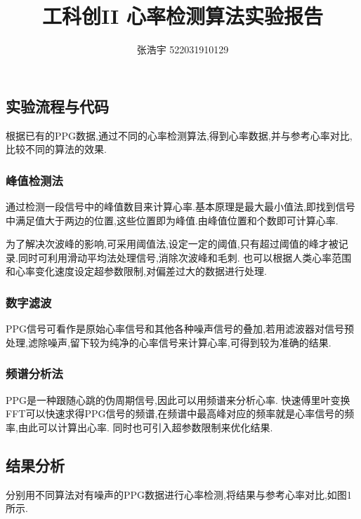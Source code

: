 \documentclass[12pt, a4paper, oneside]{ctexart}
\title{\textbf{工科创II 心率检测算法实验报告}}
\author{张浩宇 522031910129}
\date{}
\begin{document}
    \maketitle
    \subsection{实验流程与代码}
    根据已有的PPG数据,通过不同的心率检测算法,得到心率数据,并与参考心率对比,比较不同的算法的效果.
    \subsubsection{峰值检测法}
    通过检测一段信号中的峰值数目来计算心率.基本原理是最大最小值法,即找到信号中满足值大于两边的位置,这些位置即为峰值.由峰值位置和个数即可计算心率.
    
    为了解决次波峰的影响,可采用阈值法,设定一定的阈值,只有超过阈值的峰才被记录.同时可利用滑动平均法处理信号,消除次波峰和毛刺.
    也可以根据人类心率范围和心率变化速度设定超参数限制,对偏差过大的数据进行处理.
    \subsubsection{数字滤波}
    PPG信号可看作是原始心率信号和其他各种噪声信号的叠加,若用滤波器对信号预处理,滤除噪声,留下较为纯净的心率信号来计算心率,可得到较为准确的结果.
    \subsubsection{频谱分析法}
    PPG是一种跟随心跳的伪周期信号,因此可以用频谱来分析心率. 快速傅里叶变换FFT可以快速求得PPG信号的频谱,在频谱中最高峰对应的频率就是心率信号的频率,由此可以计算出心率.
    同时也可引入超参数限制来优化结果.

    \subsection{结果分析}
    分别用不同算法对有噪声的PPG数据进行心率检测,将结果与参考心率对比,如图1所示.
\end{document}
